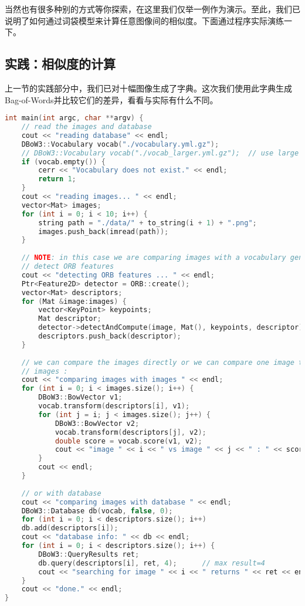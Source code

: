 当然也有很多种别的方式等你探索，在这里我们仅举一例作为演示。至此，我们已说明了如何通过词袋模型来计算任意图像间的相似度。下面通过程序实际演练一下。

\subsection{实践：相似度的计算}
上一节的实践部分中，我们已对十幅图像生成了字典。这次我们使用此字典生成Bag-of-Words并比较它们的差异，看看与实际有什么不同。

\begin{lstlisting}[language=c++,caption=slambook/ch12/loop\_closure.cpp]
int main(int argc, char **argv) {
	// read the images and database  
	cout << "reading database" << endl;
	DBoW3::Vocabulary vocab("./vocabulary.yml.gz");
	// DBoW3::Vocabulary vocab("./vocab_larger.yml.gz");  // use large vocab if you want: 
	if (vocab.empty()) {
		cerr << "Vocabulary does not exist." << endl;
		return 1;
	}
	cout << "reading images... " << endl;
	vector<Mat> images;
	for (int i = 0; i < 10; i++) {
		string path = "./data/" + to_string(i + 1) + ".png";
		images.push_back(imread(path));
	}
	
	// NOTE: in this case we are comparing images with a vocabulary generated by themselves, this may lead to overfit.
	// detect ORB features
	cout << "detecting ORB features ... " << endl;
	Ptr<Feature2D> detector = ORB::create();
	vector<Mat> descriptors;
	for (Mat &image:images) {
		vector<KeyPoint> keypoints;
		Mat descriptor;
		detector->detectAndCompute(image, Mat(), keypoints, descriptor);
		descriptors.push_back(descriptor);
	}
	
	// we can compare the images directly or we can compare one image to a database 
	// images :
	cout << "comparing images with images " << endl;
	for (int i = 0; i < images.size(); i++) {
		DBoW3::BowVector v1;
		vocab.transform(descriptors[i], v1);
		for (int j = i; j < images.size(); j++) {
			DBoW3::BowVector v2;
			vocab.transform(descriptors[j], v2);
			double score = vocab.score(v1, v2);
			cout << "image " << i << " vs image " << j << " : " << score << endl;
		}
		cout << endl;
	}
	
	// or with database 
	cout << "comparing images with database " << endl;
	DBoW3::Database db(vocab, false, 0);
	for (int i = 0; i < descriptors.size(); i++)
	db.add(descriptors[i]);
	cout << "database info: " << db << endl;
	for (int i = 0; i < descriptors.size(); i++) {
		DBoW3::QueryResults ret;
		db.query(descriptors[i], ret, 4);      // max result=4
		cout << "searching for image " << i << " returns " << ret << endl << endl;
	}
	cout << "done." << endl;
}
\end{lstlisting}

